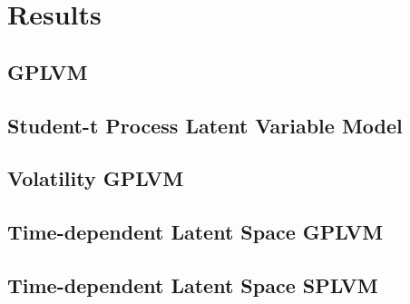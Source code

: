 \chapter{Results}

\section{GPLVM}

\label{res:gplvm}
\cleardoubleoddpage

\section{Student-t Process Latent Variable Model}

\label{res:splvm}
\cleardoubleoddpage

\section{Volatility GPLVM}

\label{res:vola}
\cleardoubleoddpage

\section{Time-dependent Latent Space GPLVM}

\label{res:time}
\cleardoubleoddpage

\section{Time-dependent Latent Space SPLVM}

\label{res:timet}
\cleardoubleoddpage